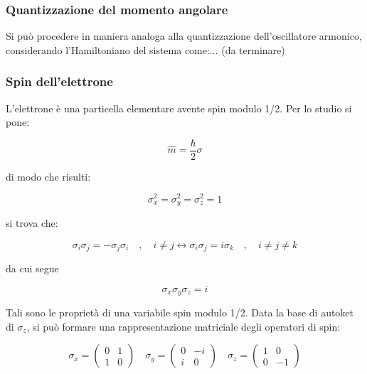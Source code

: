 \documentclass{article}
\begin{document}
\subsubsection{Quantizzazione del momento angolare}
Si può procedere in maniera analoga alla quantizzazione dell'oscillatore armonico, considerando l'Hamiltoniano del sistema come:... (da terminare)

\subsubsection{Spin dell'elettrone}
L'elettrone è una particella elementare avente spin modulo 1/2.
Per lo studio si pone:

\begin{equation}
    \hat{m}=\frac{\hbar}{2}\sigma
\end{equation}

di modo che risulti:

\begin{equation}
    \sigma_x^2=\sigma_y^2=\sigma_z^2=1
\end{equation}

si trova che:

\begin{equation}
  \sigma_i \sigma_j= -\sigma_j \sigma_i \quad , \quad i \neq j \leftrightarrow \sigma_i \sigma_j= i\sigma_k \quad , \quad i \neq j \neq k
\end{equation}

da cui segue

\begin{equation}
    \sigma_x \sigma_y \sigma_z = i
\end{equation}

Tali sono le proprietà di una variabile spin modulo 1/2.
Data la base di autoket di $\sigma_z$, si può formare una rappresentazione matriciale 
degli operatori di spin:

\begin{equation}
    \sigma_x=\begin{pmatrix}
        0 & 1 \\
        1 & 0
    \end{pmatrix}
    \quad
    \sigma_y=\begin{pmatrix}
        0 & -i \\
        i & 0
    \end{pmatrix}
    \quad
    \sigma_z=\begin{pmatrix}
        1 & 0 \\
        0 & -1
    \end{pmatrix}
\end{equation}
\end{document}
